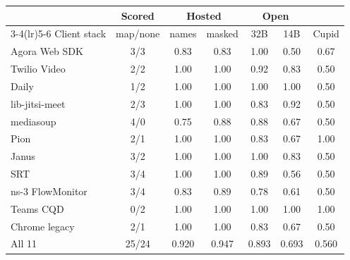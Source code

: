 \begin{tabular}{@{}l@{\hspace{3pt}}c@{\hspace{5pt}}cc@{\hspace{5pt}}cc@{\hspace{5pt}}c@{}}
\toprule
& Scored & \multicolumn{2}{c}{Hosted} & \multicolumn{2}{c}{Open} & \\ \cmidrule(lr){3-4}\cmidrule(lr){5-6}
Client stack & map/none & names & masked & 32B & 14B & Cupid \\
\midrule
Agora Web SDK & 3/3 & 0.83 & 0.83 & 1.00 & 0.50 & 0.67 \\
Twilio Video & 2/2 & 1.00 & 1.00 & 0.92 & 0.83 & 0.50 \\
Daily & 1/2 & 1.00 & 1.00 & 1.00 & 1.00 & 0.50 \\
lib-jitsi-meet & 2/3 & 1.00 & 1.00 & 0.83 & 0.92 & 0.50 \\
mediasoup & 4/0 & 0.75 & 0.88 & 0.88 & 0.67 & 0.50 \\
Pion & 2/1 & 1.00 & 1.00 & 0.83 & 0.67 & 1.00 \\
Janus & 3/2 & 1.00 & 1.00 & 1.00 & 0.83 & 0.50 \\
SRT & 3/4 & 1.00 & 1.00 & 0.89 & 0.56 & 0.50 \\
ns-3 FlowMonitor & 3/4 & 0.83 & 0.89 & 0.78 & 0.61 & 0.50 \\
Teams CQD & 0/2 & 1.00 & 1.00 & 1.00 & 1.00 & 1.00 \\
Chrome legacy & 2/1 & 1.00 & 1.00 & 0.83 & 0.67 & 0.50 \\
\midrule
All 11 & 25/24 & 0.920 & 0.947 & 0.893 & 0.693 & 0.560 \\
\bottomrule
\end{tabular}
